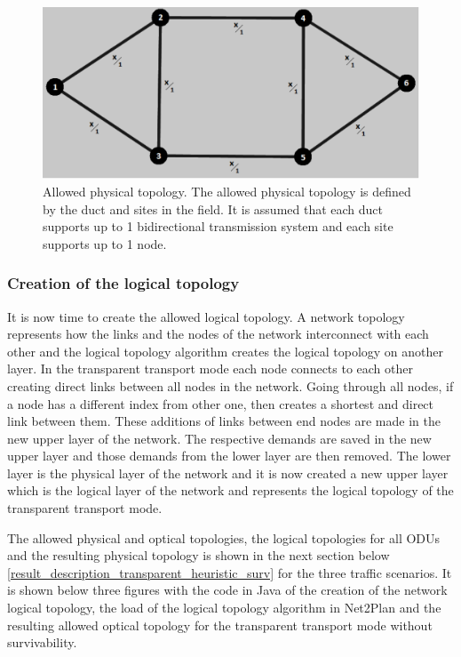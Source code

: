 \begin{figure}[H]
\centering
\includegraphics[width=13cm]{sdf/heuristic/transparent_survivability/figures/allowed_physical}
\caption{Allowed physical topology. The allowed physical topology is defined by the duct and sites in the field. It is assumed that each duct supports up to 1 bidirectional transmission system and each site supports up to 1 node.}
\label{allowed_physical_surv}
\end{figure}

\subsubsection{Creation of the logical topology}

\vspace{11pt}
It is now time to create the allowed logical topology. A network topology represents how the links and the nodes of the network interconnect with each other and the logical topology algorithm creates the logical topology on another layer. In the transparent transport mode each node connects to each other creating direct links between all nodes in the network. Going through all nodes, if a node has a different index from other one, then creates a shortest and direct link between them. These additions of links between end nodes are made in the new upper layer of the network. The respective demands are saved in the new upper layer and those demands from the lower layer are then removed. The lower layer is the physical layer of the network and it is now created a new upper layer which is the logical layer of the network and represents the logical topology of the transparent transport mode.

The allowed physical and optical topologies, the logical topologies for all ODUs and the resulting physical topology is shown in the next section below \ref{result_description_transparent_heuristic_surv} for the three traffic scenarios. It is shown below three figures with the code in Java of the creation of the network logical topology, the load of the logical topology algorithm in Net2Plan and the resulting allowed optical topology for the transparent transport mode without survivability.

